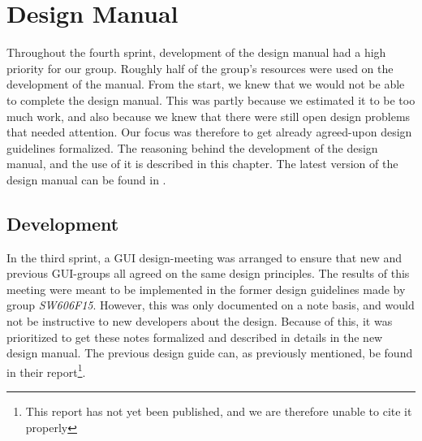 
\chapter{Design Manual}
\label{cha:design_manual}

Throughout the fourth sprint, development of the design manual had a high priority for our group. Roughly half of the group's resources were used on the development of the manual. From the start, we knew that we would not be able to complete the design manual. This was partly because we estimated it to be too much work, and also because we knew that there were still open design problems that needed attention. Our focus was therefore to get already agreed-upon design guidelines formalized. The reasoning behind the development of the design manual, and the use of it is described in this chapter. The latest version of the design manual can be found in .

\section{Development}
\label{sec:development}
In the third sprint, a GUI design-meeting was arranged to ensure that new and previous GUI-groups all agreed on the same design principles.  The results of this meeting were meant to be implemented in the former design guidelines made by group \emph{SW606F15}. However, this was only documented on a note basis, and would not be instructive to new \giraf developers about the design. Because of this, it was prioritized to get these notes formalized and described in details in the new design manual. The previous design guide can, as previously mentioned, be found in their report\footnote{This report has not yet been published, and we are therefore unable to cite it properly}.

